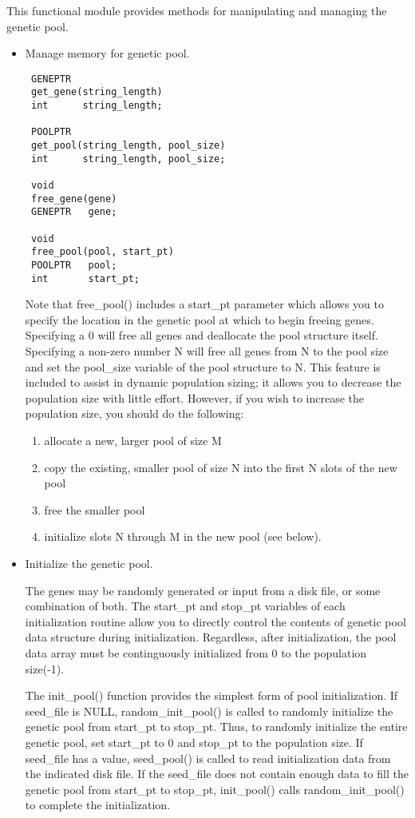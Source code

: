 This functional module provides methods for manipulating and managing
the genetic pool.  


\begin{itemize}
\item Manage memory for genetic pool.

\begin{verbatim}
 GENEPTR
 get_gene(string_length)
 int      string_length;

 POOLPTR
 get_pool(string_length, pool_size)
 int      string_length, pool_size;

 void
 free_gene(gene)
 GENEPTR   gene;

 void
 free_pool(pool, start_pt)
 POOLPTR   pool;
 int       start_pt;
\end{verbatim}

Note that free\_pool() includes a start\_pt parameter which allows you to
specify the location in the genetic pool at which to begin freeing genes.
Specifying a 0 will free all genes and deallocate the pool structure 
itself.  Specifying a non-zero number N will free all genes from N to
the pool size and set the pool\_size variable of the pool structure
to N.  This feature is included to assist in dynamic population sizing;
it allows you to decrease the population size with little effort.  However,
if you wish to increase the population size, you should do the following:

\begin{enumerate}
\item allocate a new, larger pool of size M
\item copy the existing, smaller pool of size N into the first N slots
	  of the new pool
\item free the smaller pool
\item initialize slots N through M in the new pool (see below). 
\end{enumerate}


\item Initialize the genetic pool.  

The genes may be randomly generated or input from a disk file, or some 
combination of both.  The start\_pt and stop\_pt variables of each 
initialization routine allow you to directly control the contents of 
genetic pool data structure during initialization.  Regardless, after 
initialization, the pool data array must be continguously initialized
from 0 to the population size(-1).  

The init\_pool() function provides the simplest form of pool initialization.
If seed\_file is NULL, random\_init\_pool() is called to randomly initialize
the genetic pool from start\_pt to stop\_pt.  Thus, to randomly initialize
the entire genetic pool, set start\_pt to 0 and stop\_pt to the population size.
If seed\_file has a value, seed\_pool() is called to read initialization
data from the indicated disk file.  If the seed\_file does not contain 
enough data to fill the genetic pool from start\_pt to stop\_pt, 
init\_pool() calls random\_init\_pool() to complete the initialization.


\end{itemize}
